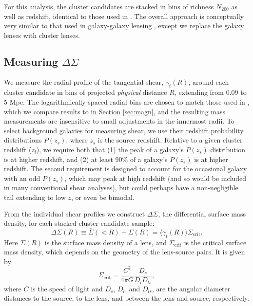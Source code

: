 For this analysis, the cluster candidates are stacked in bins of richness $N_{200}$ as well as redshift, identical to those used in \citet{Ford14}. The overall approach is conceptually very similar to that used in galaxy-galaxy lensing \citep[see][]{Velander14}, except we replace the galaxy lenses with cluster lenses.


\subsection{Measuring $\Delta\Sigma$}
\label{sec:measure}

We measure the radial profile of the tangential shear, $\gamma_t(R)$, around each cluster candidate in bins of projected {\it physical} distance $R$, extending from 0.09 to 5 Mpc. The logarithmically-spaced radial bins are chosen to match those used in \citet{Ford14}, which we compare results to in Section \ref{sec:magn}, and the resulting mass measurements are insensitive to small adjustments in the innermost radii. To select background galaxies for measuring shear, we use their redshift probability distributions $P(z_s)$, where $z_s$ is the source redshift. Relative to a given cluster redshift ($z_l$), we require both that (1) the peak of a galaxy's $P(z_s)$ distribution is at higher redshift, and (2) at least 90\% of a galaxy's $P(z_s)$ is at higher redshift. The second requirement is designed to account for the occasional galaxy with an odd $P(z_s)$, which may peak at high redshift (and so would be included in many conventional shear analyses), but could perhaps have a non-negligible tail extending to low $z$, or even be bimodal.

From the individual shear profiles we construct $\Delta\Sigma$, the differential surface mass density, for each stacked cluster candidate sample: 
\begin{equation}
\label{eqn:deltasig}
\Delta\Sigma(R) \equiv \overline{\Sigma}(<R)-\Sigma(R) = \langle \gamma_t(R) \rangle \Sigma_{\mathrm{crit}}.
\end{equation}
Here $\Sigma(R)$ is the surface mass density of a lens, and $\Sigma_{\mathrm{crit}}$ is the critical surface mass density, which depends on the geometry of the lens-source pairs. It is given by
\begin{equation}
\label{eqn:sigcrit}
\Sigma_{\mathrm{crit}} = \frac{C^2}{4 \pi G} \frac{D_s}{D_l D_{ls}},
\end{equation}
where $C$ is the speed of light and $D_s$, $D_l$, and $D_{ls}$, are the angular diameter distances to the source, to the lens, and between the lens and source, respectively. 

